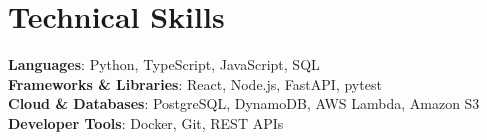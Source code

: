 \documentclass[a4paper,11pt]{article}
\begin{document}
\section{Technical Skills}
 \begin{itemize}[leftmargin=0.15in, label={}]
    \small{\item{
     \textbf{Languages}{: Python, TypeScript, JavaScript, SQL} \\
     \textbf{Frameworks \& Libraries}{: React, Node.js, FastAPI, pytest} \\
     \textbf{Cloud \& Databases}{: PostgreSQL, DynamoDB, AWS Lambda, Amazon S3} \\
     \textbf{Developer Tools}{: Docker, Git, REST APIs}
    }}
 \end{itemize}
\end{document}
